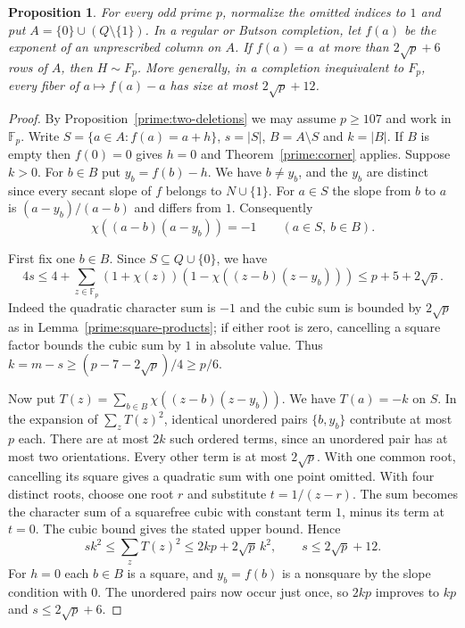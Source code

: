 \documentclass[11pt,a4paper]{article}
\newtheorem{proposition}[theorem]{Proposition}
\numberwithin{equation}{section}
\begin{document}
\begin{proposition}\label{prime:arbitrary-rows}
For every odd prime $p$, normalize the omitted indices to $1$ and put $A=\{0\}\cup(Q\setminus\{1\})$. In a regular or Butson completion, let $f(a)$ be the exponent of an unprescribed column on $A$. If $f(a)=a$ at more than $2\sqrt p+6$ rows of $A$, then $H\sim F_p$. More generally, in a completion inequivalent to $F_p$, every fiber of $a\mapsto f(a)-a$ has size at most $2\sqrt p+12$.
\end{proposition}
\begin{proof}
By Proposition~\ref{prime:two-deletions} we may assume $p\ge107$ and work in $\mathbb F_p$. Write $S=\{a\in A:f(a)=a+h\}$, $s=|S|$, $B=A\setminus S$ and $k=|B|$. If $B$ is empty then $f(0)=0$ gives $h=0$ and Theorem~\ref{prime:corner} applies. Suppose $k>0$. For $b\in B$ put $y_b=f(b)-h$. We have $b\ne y_b$, and the $y_b$ are distinct since every secant slope of $f$ belongs to $N\cup\{1\}$. For $a\in S$ the slope from $b$ to $a$ is $(a-y_b)/(a-b)$ and differs from $1$. Consequently
$$\chi((a-b)(a-y_b))=-1\qquad(a\in S,\ b\in B).$$

First fix one $b\in B$. Since $S\subseteq Q\cup\{0\}$, we have
$$4s\le 4+\sum_{z\in\mathbb F_p}(1+\chi(z))(1-\chi((z-b)(z-y_b)))
       \le p+5+2\sqrt p.$$
Indeed the quadratic character sum is $-1$ and the cubic sum is bounded by $2\sqrt p$ as in Lemma~\ref{prime:square-products}; if either root is zero, cancelling a square factor bounds the cubic sum by $1$ in absolute value. Thus $k=m-s\ge(p-7-2\sqrt p)/4\ge p/6$.

Now put $T(z)=\sum_{b\in B}\chi((z-b)(z-y_b))$. We have $T(a)=-k$ on $S$. In the expansion of $\sum_z T(z)^2$, identical unordered pairs $\{b,y_b\}$ contribute at most $p$ each. There are at most $2k$ such ordered terms, since an unordered pair has at most two orientations. Every other term is at most $2\sqrt p$. With one common root, cancelling its square gives a quadratic sum with one point omitted. With four distinct roots, choose one root $r$ and substitute $t=1/(z-r)$. The sum becomes the character sum of a squarefree cubic with constant term $1$, minus its term at $t=0$. The cubic bound gives the stated upper bound. Hence
$$s k^2\le \sum_z T(z)^2\le 2kp+2\sqrt p\,k^2,\qquad s\le 2\sqrt p+12.$$
For $h=0$ each $b\in B$ is a square, and $y_b=f(b)$ is a nonsquare by the slope condition with $0$. The unordered pairs now occur just once, so $2kp$ improves to $kp$ and $s\le2\sqrt p+6$.
\end{proof}
\end{document}
